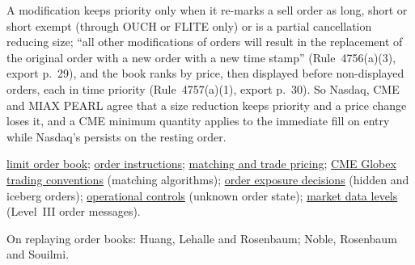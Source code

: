 \begin{qfmechanism}
A modification keeps priority only when it re-marks a sell order as long, short or short exempt (through OUCH or FLITE only) or is a partial cancellation reducing size; ``all other modifications of orders will result in the replacement of the original order with a new order with a new time stamp'' (Rule~4756(a)(3), export p.~29), and the book ranks by price, then displayed before non-displayed orders, each in time priority (Rule~4757(a)(1), export p.~30). So Nasdaq, CME and MIAX PEARL agree that a size reduction keeps priority and a price change loses it, and a CME minimum quantity applies to the immediate fill on entry while Nasdaq's persists on the resting order.

 \hyperref[def:limit-order-book]{limit order book}; \hyperref[def:order-instructions]{order instructions}; \hyperref[mech:order-matching-pricing]{matching and trade pricing}; \hyperref[conv:cme-globex-trading]{CME Globex trading conventions} (matching algorithms); \hyperref[def:order-exposure-decisions]{order exposure decisions} (hidden and iceberg orders); \hyperref[meth:automated-trading-operational-controls]{operational controls} (unknown order state); \hyperref[data:market-data-levels]{market data levels} (Level~III order messages).

 On replaying order books: Huang, Lehalle and Rosenbaum; Noble, Rosenbaum and Souilmi.

\end{qfmechanism}

